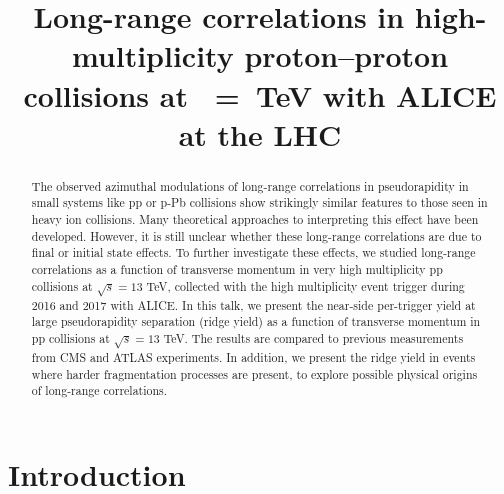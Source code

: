 \documentclass[ALICE,manyauthors]{cernphprep}
\begin{document}
\begin{titlepage}

\PHyear{}
\PHdate{\today}
%

\title{Long-range correlations  in high-multiplicity  proton--proton collisions  at \s~=~\unit[13]{TeV} with ALICE at the LHC}


\begin{abstract}

The observed azimuthal modulations of long-range correlations in pseudorapidity in small systems like pp or p-Pb collisions show strikingly similar features to those seen in heavy ion collisions. Many theoretical approaches to interpreting this effect have been developed. However, it is still unclear whether these long-range correlations are due to final or initial state effects. To further investigate these effects, we studied long-range correlations as a function of transverse momentum in very high multiplicity pp collisions at $\sqrt{s} =13$ TeV, collected with the high multiplicity event trigger during 2016 and 2017 with ALICE. In this talk, we present the near-side per-trigger yield at large pseudorapidity separation (ridge yield) as a function of transverse momentum in pp collisions at $\sqrt{s} =13$ TeV. The results are compared to previous measurements from CMS and ATLAS experiments. In addition, we present the ridge yield in events where harder fragmentation processes are present, to explore possible physical origins of long-range correlations.

\end{abstract}
\end{titlepage}
\setcounter{page}{2}



\section{Introduction}
\end{document}
